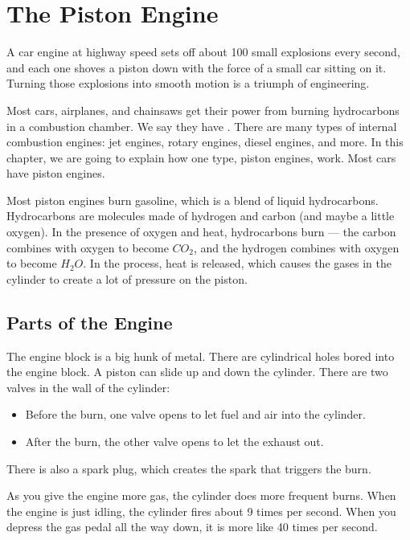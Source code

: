 \chapter{The Piston Engine}

A car engine at highway speed sets off about 100 small explosions every second, and each one shoves a piston down with the force of a small car sitting on it. Turning those explosions into smooth motion is a triumph of engineering.

Most cars, airplanes, and chainsaws get their power from burning hydrocarbons in a 
combustion chamber. We say they have . There are many types of internal combustion engines: jet engines, rotary engines, diesel engines, and more. In this chapter, we are 
going to explain how one type, piston engines, work. Most cars have piston engines. 

Most piston engines burn gasoline, which is a blend of liquid hydrocarbons. Hydrocarbons are molecules made of hydrogen and carbon (and maybe a little oxygen). In the presence of oxygen and heat, hydrocarbons burn --- the carbon combines with oxygen to become $CO_2$, and the hydrogen combines with oxygen to become $H_2O$. In the process, heat is released, which causes the gases in the cylinder to create a lot of pressure on the piston.


\section{Parts of the Engine}
The engine block is a big hunk of metal. There are cylindrical holes bored into the engine block. A piston can slide up and down the cylinder. There are two valves in the wall of the cylinder: 
\begin{itemize}
\item Before the burn, one valve opens to let fuel and air into the cylinder.
\item After the burn, the other valve opens to let the exhaust out.
\end{itemize}

There is also a spark plug, which creates the spark that triggers the burn.

As you give the engine more gas, the cylinder does more frequent burns. When the engine is just idling, the cylinder fires about 9 times per second. When you depress the gas pedal all the way down, it is more like 40 times per second.

